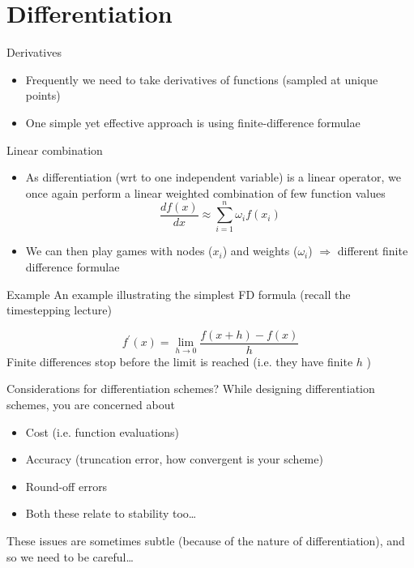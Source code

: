 \documentclass[presentation]{beamer}
\begin{document}
\section{Differentiation}
\label{sec:orged7c2df}
\begin{frame}[label={sec:org30f39b1}]{Derivatives}
\begin{itemize}
\item Frequently we need to take derivatives of functions (sampled at
unique points)
\item One simple yet effective approach is using \alert{finite-difference} formulae
\end{itemize}
\begin{block}{Linear combination}
\begin{itemize}
\item As differentiation (wrt to one independent variable) is a linear operator,
we once again perform a linear weighted combination of few function values
\[ \frac{d f(x)}{d x} \approx \sum_{i=1}^{n} \omega_i f(x_i) \]
\item We can then play games with \alert{nodes} (\(x_i\)) and \alert{weights} (\(\omega_i\))
\(\Rightarrow\) different finite difference formulae
\end{itemize}
\end{block}
\end{frame}
\begin{frame}[label={sec:org5658ddf}]{Example}
An example illustrating the simplest FD formula (recall the timestepping lecture)
\begin{example}
\[ f^{\prime}(x) = \lim_{h \to 0} \frac{f(x+h) - f(x) }{h}\]
Finite differences stop before the limit is reached (i.e. they have finite
\(h\) )
\end{example}
\end{frame}
\begin{frame}[label={sec:org1ecc690}]{Considerations for differentiation schemes?}
While designing differentiation schemes, you are concerned about
\begin{itemize}
\item Cost (i.e. function evaluations)
\item Accuracy (truncation error, how convergent is your scheme)
\item Round-off errors
\item Both these relate to stability too\ldots{}
\end{itemize}

These issues are sometimes subtle (because of the nature of differentiation),
and so we need to be careful\ldots{}
\end{frame}
\end{document}
